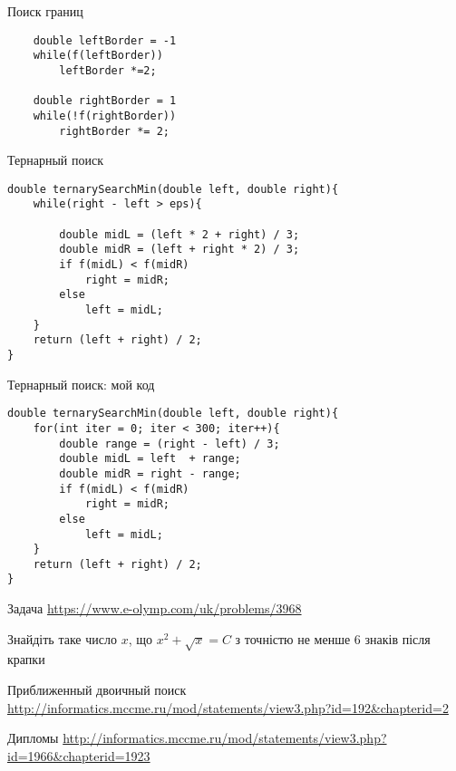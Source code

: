 \documentclass{beamer}
\begin{document}
\begin{frame}[fragile]{Поиск границ}
    \begin{verbatim}
    double leftBorder = -1
    while(f(leftBorder))
        leftBorder *=2;

    double rightBorder = 1
    while(!f(rightBorder))
        rightBorder *= 2;
    \end{verbatim}
\end{frame}



\begin{frame}[fragile]{Тернарный поиск}
\begin{verbatim}
double ternarySearchMin(double left, double right){
    while(right - left > eps){
    
        double midL = (left * 2 + right) / 3;
        double midR = (left + right * 2) / 3;
        if f(midL) < f(midR)
            right = midR;
        else
            left = midL;
    }
    return (left + right) / 2;
}    
\end{verbatim}
\end{frame}

\begin{frame}[fragile]{Тернарный поиск: мой код}
\begin{verbatim}
double ternarySearchMin(double left, double right){
    for(int iter = 0; iter < 300; iter++){
        double range = (right - left) / 3;
        double midL = left  + range;
        double midR = right - range;
        if f(midL) < f(midR)
            right = midR;
        else
            left = midL;
    }
    return (left + right) / 2;
}    
\end{verbatim}
\end{frame}


\begin{frame}{Задача}
\url{https://www.e-olymp.com/uk/problems/3968}

Знайдіть таке число $x$, що $x^2 + \sqrt{x} = C$ з точністю не менше 6 знаків після крапки
\end{frame}


\begin{frame}{Приближенный двоичный поиск}
\url{http://informatics.mccme.ru/mod/statements/view3.php?id=192&chapterid=2}
\end{frame}


\begin{frame}{Дипломы}
\url{http://informatics.mccme.ru/mod/statements/view3.php?id=1966&chapterid=1923}
\end{frame}
\end{document}

